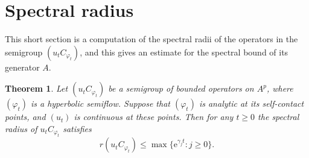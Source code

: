 \documentclass{amsart}
\theoremstyle{proclaim}
\newtheorem{theorem}{Theorem}[section]
\theoremstyle{fancyproclaim}
\theoremstyle{definition}
\theoremstyle{fancystatement}
\numberwithin{equation}{section}
\begin{document}
\section{Spectral radius}\label{sec3}

This short section is a computation of the spectral radii of the operators in the semigroup $(u_tC_{\varphi_t})$, and this gives an estimate for the spectral bound of its generator $A$.

\begin{theorem}\label{rad}
Let $(u_tC_{\varphi_t})$ be a semigroup of bounded operators on $A^p$, where $(\varphi_t)$ is a hyperbolic semiflow. Suppose that $(\varphi_t)$ is analytic at its self-contact points, and $(u_t)$ is continuous at these points. Then for any $t\geq0$ the spectral radius of $u_tC_{\varphi_t}$ satisfies
$$r(u_tC_{\varphi_t})\leq\max\bigl\{\mathrm{e}^{\gamma_j t} : j\geq0\bigr\}.$$
\end{theorem}
\end{document}
